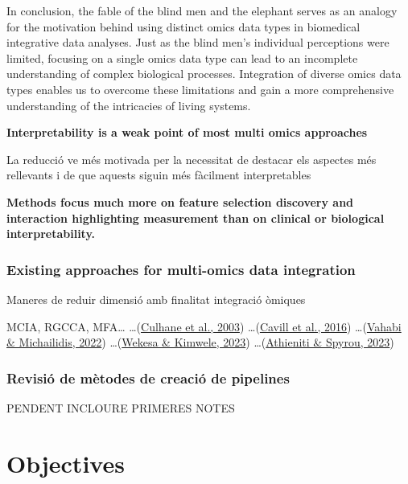\documentclass[a4paper, nobind]{templates/ociamthesis}
\begin{document}
In conclusion, the fable of the blind men and the elephant serves as an analogy for the motivation behind using distinct omics data types in biomedical integrative data analyses. Just as the blind men's individual perceptions were limited, focusing on a single omics data type can lead to an incomplete understanding of complex biological processes. Integration of diverse omics data types enables us to overcome these limitations and gain a more comprehensive understanding of the intricacies of living systems.

\textbf{Interpretability is a weak point of most multi omics approaches}

La reducció ve més motivada per la necessitat de destacar els aspectes més rellevants i de que aquests siguin més fàcilment interpretables

\textbf{Methods focus much more on feature selection discovery and interaction highlighting measurement than on clinical or biological interpretability.}

\hypertarget{existing-approaches-for-multi-omics-data-integration}{%
\subsection{Existing approaches for multi-omics data integration}\label{existing-approaches-for-multi-omics-data-integration}}

Maneres de reduir dimensió amb finalitat integració òmiques

MCIA, RGCCA, MFA\ldots{}
\ldots{}(\protect\hyperlink{ref-culhane_cross-platform_2003}{Culhane et al., 2003})
\ldots{}(\protect\hyperlink{ref-cavill_transcriptomic_2016}{Cavill et al., 2016})
\ldots{}(\protect\hyperlink{ref-vahabi_unsupervised_2022}{Vahabi \& Michailidis, 2022})
\ldots{}(\protect\hyperlink{ref-wekesa_review_2023}{Wekesa \& Kimwele, 2023})
\ldots{}(\protect\hyperlink{ref-athieniti_guide_2023}{Athieniti \& Spyrou, 2023})

\hypertarget{revisiuxf3-de-muxe8todes-de-creaciuxf3-de-pipelines}{%
\subsection{Revisió de mètodes de creació de pipelines}\label{revisiuxf3-de-muxe8todes-de-creaciuxf3-de-pipelines}}

PENDENT INCLOURE PRIMERES NOTES

\hypertarget{objectives}{%
\chapter{Objectives}\label{objectives}}
\end{document}
